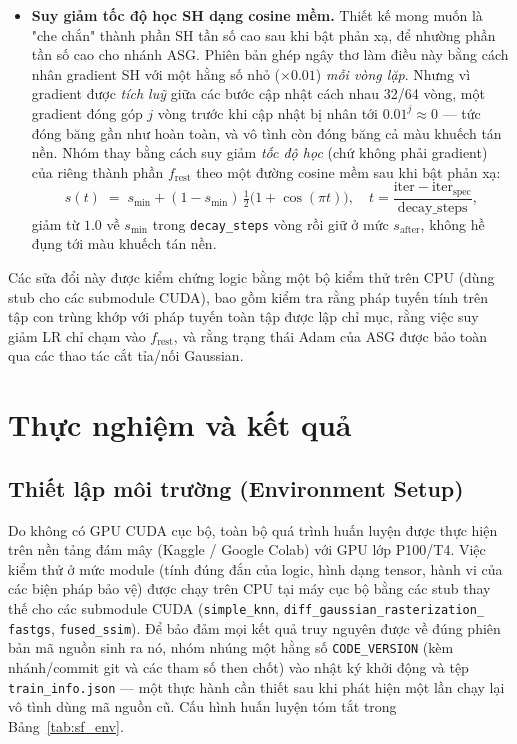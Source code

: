 \begin{itemize}
{        lượng tần số cao thực sự} của nhánh phản xạ — chỉ nhận được vài trăm bước
        Adam trên toàn bộ vòng đời, tức bị "bỏ đói" nghiêm trọng. Nhóm tách ASG ra
        một bộ tối ưu Adam riêng, bước cập nhật \textit{mỗi khi} MLP chạy, để latent
        học theo đúng nhịp của MLP; bộ tối ưu này được nối đúng qua các thao tác cắt
        tỉa và nối Gaussian.
        \item \textbf{Suy giảm tốc độ học SH dạng cosine mềm.} Thiết kế mong muốn là
        "che chắn" thành phần SH tần số cao sau khi bật phản xạ, để nhường phần tần
        số cao cho nhánh ASG. Phiên bản ghép ngây thơ làm điều này bằng cách nhân
        gradient SH với một hằng số nhỏ ($\times 0.01$) \textit{mỗi vòng lặp}. Nhưng
        vì gradient được \textit{tích luỹ} giữa các bước cập nhật cách nhau 32/64
        vòng, một gradient đóng góp $j$ vòng trước khi cập nhật bị nhân tới
        $0.01^{j}\!\approx\!0$ — tức đóng băng gần như hoàn toàn, và vô tình còn đóng
        băng cả màu khuếch tán nền. Nhóm thay bằng cách suy giảm \textit{tốc độ học}
        (chứ không phải gradient) của riêng thành phần $f_{\text{rest}}$ theo một
        đường cosine mềm sau khi bật phản xạ:
        \[
            s(t) \;=\; s_{\min} + (1 - s_{\min})\,\tfrac{1}{2}\big(1 + \cos(\pi t)\big),
            \quad t = \frac{\text{iter} - \text{iter}_{\text{spec}}}{\text{decay\_steps}},
        \]
        giảm từ $1.0$ về $s_{\min}$ trong \texttt{decay\_steps} vòng rồi giữ ở mức
        $s_{\text{after}}$, không hề đụng tới màu khuếch tán nền.
    \end{itemize}
    Các sửa đổi này được kiểm chứng logic bằng một bộ kiểm thử trên CPU (dùng stub
    cho các submodule CUDA), bao gồm kiểm tra rằng pháp tuyến tính trên tập con
    trùng khớp với pháp tuyến toàn tập được lập chỉ mục, rằng việc suy giảm LR chỉ
    chạm vào $f_{\text{rest}}$, và rằng trạng thái Adam của ASG được bảo toàn qua các
    thao tác cắt tỉa/nối Gaussian.

\newpage
\section{Thực nghiệm và kết quả}

    \subsection{Thiết lập môi trường (Environment Setup)}
    Do không có GPU CUDA cục bộ, toàn bộ quá trình huấn luyện được thực hiện trên
    nền tảng đám mây (Kaggle / Google Colab) với GPU lớp P100/T4. Việc kiểm thử ở
    mức module (tính đúng đắn của logic, hình dạng tensor, hành vi của các biện pháp
    bảo vệ) được chạy trên CPU tại máy cục bộ bằng các stub thay thế cho các
    submodule CUDA (\texttt{simple\_knn}, \texttt{diff\_gaussian\_rasterization\_%
fastgs}, \texttt{fused\_ssim}). Để bảo đảm mọi kết quả truy nguyên được về đúng
    phiên bản mã nguồn sinh ra nó, nhóm nhúng một hằng số \texttt{CODE\_VERSION}
    (kèm nhánh/commit git và các tham số then chốt) vào nhật ký khởi động và tệp
    \texttt{train\_info.json} — một thực hành cần thiết sau khi phát hiện một lần
    chạy lại vô tình dùng mã nguồn cũ. Cấu hình huấn luyện tóm tắt trong
    Bảng~\ref{tab:sf_env}.

